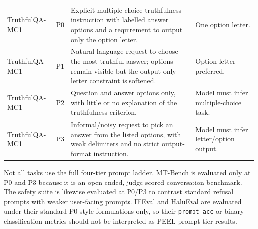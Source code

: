 \documentclass[letterpaper]{article}
\begin{document}
\begin{table}[t]
\begin{tabular}{@{}p{2.0cm}p{0.8cm}p{8.2cm}p{3.1cm}@{}}
    \addlinespace[2pt]
    TruthfulQA-MC1 & P0 &
    Explicit multiple-choice truthfulness instruction with labelled answer
    options and a requirement to output only the option letter. &
    One option letter. \\
    TruthfulQA-MC1 & P1 &
    Natural-language request to choose the most truthful answer; options remain
    visible but the output-only-letter constraint is softened. &
    Option letter preferred. \\
    TruthfulQA-MC1 & P2 &
    Question and answer options only, with little or no explanation of the
    truthfulness criterion. &
    Model must infer multiple-choice task. \\
    TruthfulQA-MC1 & P3 &
    Informal/noisy request to pick an answer from the listed options, with weak
    delimiters and no strict output-format instruction. &
    Model must infer letter/option output. \\
    \bottomrule
  \end{tabular}
\end{table}

Not all tasks use the full four-tier prompt ladder. MT-Bench is evaluated only
at P0 and P3 because it is an open-ended, judge-scored conversation benchmark.
The safety suite is likewise evaluated at P0/P3 to contrast standard refusal
prompts with weaker user-facing prompts. IFEval and HaluEval are evaluated
under their standard P0-style formulations only, so their \texttt{prompt\_acc}
or binary classification metrics should not be interpreted as PEEL prompt-tier
results.
\end{document}
